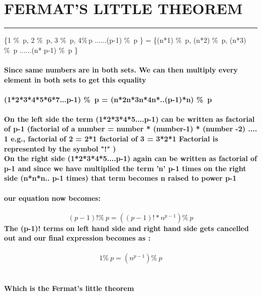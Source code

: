 \documentclass{article}
\begin{document}
\section * {FERMAT'S LITTLE THEOREM}
\hrule 
\bigskip 
\{1 \%\ p, 2 \%\ p, 3 \%\ p, 4\%\,p ......(p-1) \%\ p \} = \{(n*1) \%\ p, (n*2) \%\ p, (n*3) \%\ p ......(n* p-1) \%\ p \}
\\
\\
\textbf{Since  same numbers are in
both sets. We can then multiply every element in both sets to get this equality
\\
\\
(1*2*3*4*5*6*7...p-1) \%\ p = (n*2n*3n*4n*..(p-1)*n) \%\ p
\\
\\
On the left side the term (1*2*3*4*5....p-1) can be written as factorial of p-1 (factorial of a number = number * (number-1) * (number -2) .... 1 e.g., factorial of 2 = 2*1 factorial of 3 = 3*2*1 Factorial is represented by the symbol "!" ) \\
On the right side  (1*2*3*4*5....p-1) again  can be written as factorial of p-1 and since we have  multiplied the term 'n'  p-1 times on the right side  (n*n*n.. p-1 times) that term becomes n raised to power p-1 \\ \\ 
our equation now becomes:} 
\\ 
\\ 
\textbf{\[ (p-1)! \%\ p = ((p-1)! * n^{p-1}) \%\ p   \] }
\textbf {The (p-1)! terms on left hand side and right hand side gets cancelled out and our final expression becomes as :}
\\
\\
\textbf{\[ 1 \%\ p = (n ^{p-1}) \%\ p \]}
\\
\\
\textbf{Which is the Fermat's little theorem}
\end{document}
